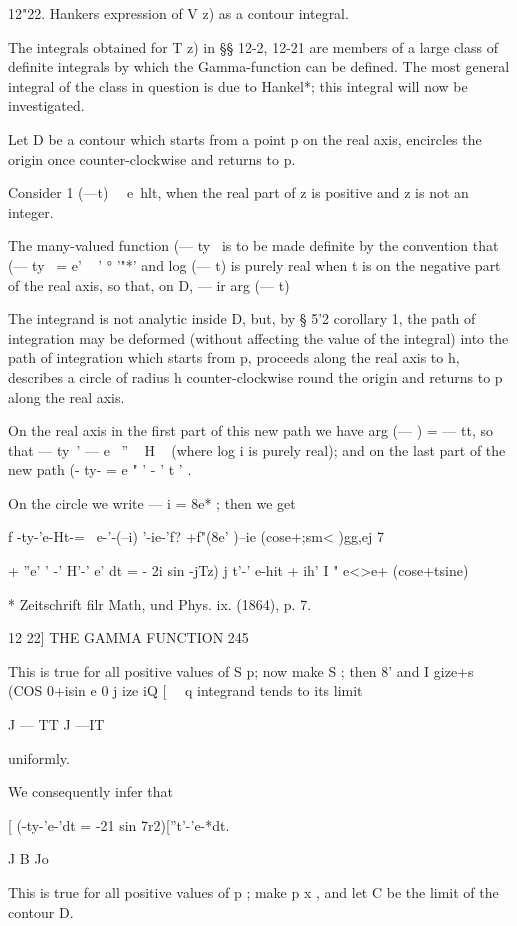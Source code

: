 12"22. Hankers expression of V z) as a contour integral.

The integrals obtained for T z) in §§ 12-2, 12-21 are members of a
large class of definite integrals by which the Gamma-function can be
defined. The most general integral of the class in question is due to
Hankel*; this integral will now be investigated.

Let D be a contour which starts from a point p on the real axis,
encircles the origin once counter-clockwise and returns to p.

Consider 1 (—t)~~ e~hlt, when the real part of z is positive and z is
not an integer.

The many-valued function (— ty~ is to be made definite by the
convention that (— ty~ = e' ~ ' ° '"*' and log (— t) is purely real
when t is on the negative part of the real axis, so that, on D, — ir %
arg (— t) %

The integrand is not analytic inside D, but, by § 5'2 corollary 1, the
path of integration may be deformed (without affecting the value of
the integral) into the path of integration which starts from p,
proceeds along the real axis to h, describes a circle of radius h
counter-clockwise round the origin and returns to p along the real
axis.

On the real axis in the first part of this new path we have arg (— ) =
— tt, so that — ty~' — e~ '' ~ H ~ (where log i is purely real); and
on the last part of the new path (- ty- = e " ' - ' t ' .

On the circle we write — i = 8e* ; then we get

f -ty-'e-Ht-= \ e-'-(--i) '-ie-'f? +f"(8e' )--ie (cose+;sm< )gg,ej 7

+ ''e' ' -' H'-' e' dt = - 2i sin -jTz) j t'-' e-hit + ih' I " e<>e+
(cose+tsine) \

* Zeitschrift filr Math, und Phys. ix. (1864), p. 7.

12 22] THE GAMMA FUNCTION 245

This is true for all positive values of S p; now make S ; then 8' and
I gize+s (COS 0+isin e 0 j ize iQ [ \ \ q integrand tends to its limit

J — TT J —IT

uniformly.

We consequently infer that

[ (-ty-'e-'dt = -21 sin 7r2)[''t'-'e-*dt.

J B Jo

This is true for all positive values of p ; make p x , and let C be
the limit of the contour D.

